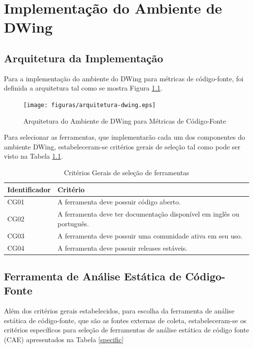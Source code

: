 \chapter{Implementação do Ambiente de DWing}
\label{estudo de caso}

\section{Arquitetura da Implementação}

Para a implementação do ambiente do DWing para métricas de código-fonte, foi definida a arquitetura tal como se mostra Figura \ref{arquitetura}.


\begin{figure}[ht!]
\centering
\texttt{[image: figuras/arquitetura-dwing.eps]}
\caption{Arquitetura do Ambiente de DWing para Métricas de Código-Fonte}
\label{arquitetura}
\end{figure}
\FloatBarrier

Para selecionar as ferramentas, que implementarão cada um dos componentes do ambiente DWing, estabeleceram-se critérios gerais de seleção tal como pode ser visto na Tabela \ref{seleção}.


	\begin{table}[!ht]
	\begin{center}
	 \begin{tabular}{|l|l|}
		\hline
		Identificador & Critério 
		\\ \hline
		CG01 & A ferramenta deve possuir código aberto.  
		\\ \hline
		CG02 & A ferramenta deve ter documentação disponível em inglês ou português.      
		\\ \hline
		CG03 & A ferramenta deve possuir uma comunidade ativa em seu uso.
		\\ \hline
		CG04 & A ferramenta deve possuir releases estáveis.    
		\\ \hline
		\end{tabular}
		\caption{Critérios Gerais de seleção de ferramentas}
		\label{seleção}
		\end{center}
		\end{table}	


\section{Ferramenta de Análise Estática de Código-Fonte}

Além dos critérios gerais estabelecidos, para escolha da ferramenta de análise estática de código-fonte, que são as fontes externas de coleta, estabeleceram-se os critérios específicos para seleção de ferramentas de análise estática de código fonte (CAE) apresentados na Tabela \ref{specific}


